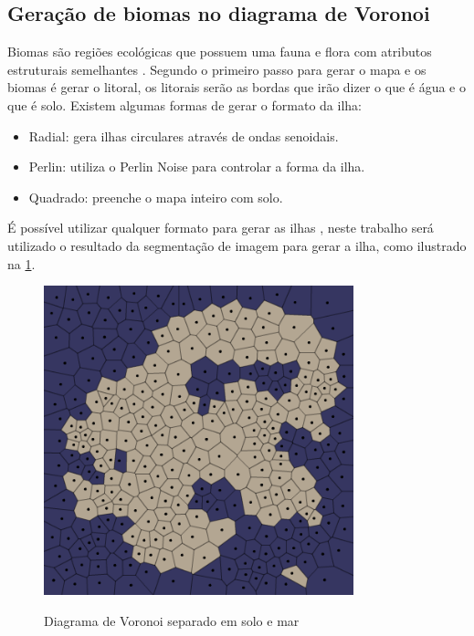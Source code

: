 \subsection{Geração de biomas no diagrama de Voronoi}

Biomas são regiões ecológicas que possuem uma fauna e flora com atributos estruturais semelhantes \cite{maestrovirtuale}. Segundo  o primeiro passo para gerar o mapa e os biomas é gerar o litoral, os litorais serão as bordas que irão dizer o que é água e o que é solo. Existem algumas formas de gerar o formato da ilha:

\begin{itemize}
    \item Radial: gera ilhas circulares através de ondas senoidais.
    \item Perlin: utiliza o Perlin Noise para controlar a forma da ilha.
    \item Quadrado: preenche o mapa inteiro com solo.
\end{itemize}

É possível utilizar qualquer formato para gerar as ilhas \cite{amitp2010}, neste trabalho será utilizado o resultado da segmentação de imagem para gerar a ilha, como ilustrado na \cref{fig:voronoi-land-water}.

\begin{figure}[ht]
	\caption{Diagrama de Voronoi separado em solo e mar}
	\centering %
	\includegraphics[width=0.8\textwidth]{figures/voronoi-land-water.png} %
	\label{fig:voronoi-land-water}
\end{figure}

